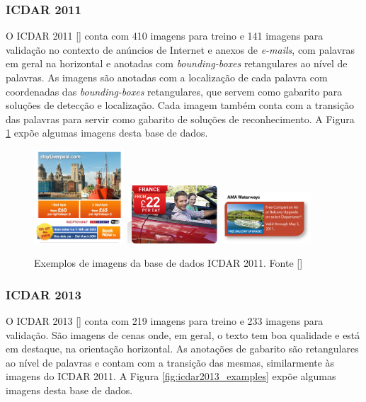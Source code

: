 \subsubsection{ICDAR 2011}\label{sec:datasets_icdar2011}
O ICDAR 2011 [] conta com 410 imagens para treino e 141 imagens para validação no contexto de anúncios de Internet e anexos 
de \textit{e-mails}, com palavras em geral na horizontal e anotadas com \textit{bounding-boxes} retangulares ao nível de palavras. As imagens 
são anotadas com a localização de cada palavra com coordenadas das \textit{bounding-boxes} retangulares, que servem como gabarito para soluções 
de detecção e localização. Cada imagem também conta com a transição das palavras para servir como gabarito de soluções de reconhecimento. 
A Figura \ref{fig:icdar2011_examples} expõe algumas imagens desta base de dados.

\begin{figure}
    \centering
    \includegraphics[width=0.3\textwidth]{figs/img_33.png}
    \includegraphics[width=0.3\textwidth]{figs/img_62.jpg}
    \includegraphics[width=0.3\textwidth]{figs/img_13.jpg}
    \caption{Exemplos de imagens da base de dados ICDAR 2011. Fonte []}
        \label{fig:icdar2011_examples}
\end{figure}

\subsubsection{ICDAR 2013}\label{sec:datasets_icdar2013}
O ICDAR 2013 [] conta com 219 imagens para treino e 233 imagens para validação. São imagens de cenas onde, em geral, o texto 
tem boa qualidade e está em destaque, na orientação horizontal. As anotações de gabarito são retangulares ao nível de palavras e contam com a 
transição das mesmas, similarmente às imagens do ICDAR 2011. A Figura \ref{fig:icdar2013_examples} expõe algumas imagens desta base de dados.

